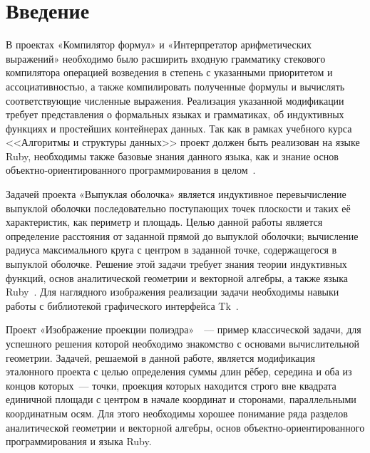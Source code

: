 \section{Введение}

В проектах «Компилятор формул» и «Интерпретатор арифметических
выражений» необходимо было расширить входную грамматику стекового компилятора операцией возведения в степень с указанными приоритетом и ассоциативностью, а также компилировать полученные формулы и вычислять соответствующие численные выражения. Реализация указанной модификации требует представления о формальных языках и грамматиках, об индуктивных функциях и простейших контейнерах данных. Так как в рамках учебного курса <<Алгоритмы и структуры данных>> проект должен быть реализован на языке Ruby, необходимы также базовые знания данного языка, как и знание основ объектно-ориентированного
программирования в целом~\cite{ruby}. 

Задачей проекта «Выпуклая оболочка»\cite{convex} является индуктивное 
перевычисление выпуклой оболочки последовательно поступающих точек плоскости и таких её
характеристик, как периметр и площадь. Целью данной работы является
определение расстояния от заданной прямой до выпуклой оболочки; вычисление радиуса максимального круга с центром в заданной точке, содержащегося в выпуклой оболочке. Решение этой задачи требует знания теории индуктивных функций, основ аналитической геометрии и векторной алгебры, а также языка Ruby~\cite{ruby}. Для наглядного изображения реализации задачи необходимы навыки работы с библиотекой графического интерфейса Tk~\cite{tk}. 

Проект «Изображение проекции полиэдра»~\cite{polyedr}~--- пример
классической задачи, для успешного решения которой необходимо знакомство с
основами вычислительной геометрии. Задачей, решаемой в данной работе, является
модификация эталонного проекта с целью определения суммы длин рёбер, середина и оба из концов которых~--- точки, проекция которых находится строго вне квадрата единичной площади с центром в начале координат и сторонами, параллельными координатным осям. Для этого необходимы хорошее понимание ряда разделов 
аналитической геометрии и векторной алгебры, основ объектно-ориентированного
программирования и языка Ruby. 
